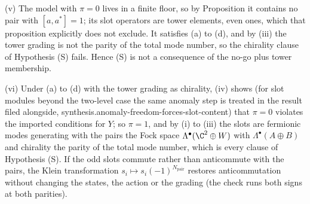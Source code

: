 (v) The model with $\pi = 0$ lives in a finite floor, so by Proposition  it contains no pair with $[a, a^{*}] = 1$; its slot operators are tower elements, even ones, which that proposition explicitly does not exclude. It satisfies (a) to (d), and by (iii) the tower grading is not the parity of the total mode number, so the chirality clause of Hypothesis (S) fails. Hence (S) is not a consequence of the no-go plus tower membership.

(vi) Under (a) to (d) with the tower grading as chirality, (iv) shows (for slot modules beyond the two-level case the same anomaly step is treated in the result filed alongside, synthesis.anomaly-freedom-forces-slot-content) that $\pi = 0$ violates the imported conditions for $Y$; so $\pi = 1$, and by (i) to (iii) the slots are fermionic modes generating with the pairs the Fock space $\Lambda^{\bullet}(\C^{2} \oplus W)$ with $\Lambda^{\bullet}(A \oplus B)$ and chirality the parity of the total mode number, which is every clause of Hypothesis (S). If the odd slots commute rather than anticommute with the pairs, the Klein transformation $s_{i} \mapsto s_{i}(-1)^{N_{\mathrm{pair}}}$ restores anticommutation without changing the states, the action or the grading (the check runs both signs at both parities).
